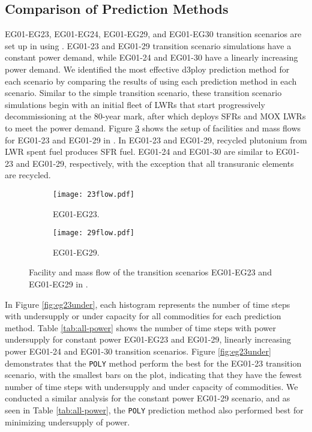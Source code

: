 \subsection{Comparison of Prediction Methods}

EG01-EG23, EG01-EG24, EG01-EG29, and EG01-EG30 transition scenarios
are set up in \Cyclus using \deploy. 
EG01-23 and EG01-29 transition scenario simulations have a constant 
power demand, while EG01-24 and EG01-30 have a linearly increasing
power demand. 
We identified the most effective d3ploy prediction method 
for each scenario by comparing the results of using each 
prediction method in each scenario. 
Similar to the simple transition scenario, these transition scenario 
simulations begin with an initial fleet of \glspl{LWR} 
that start progressively decommissioning at the 80-year mark, 
after which \deploy deploys \glspl{SFR} and \gls{MOX} \glspl{LWR} to meet 
the power demand. 
Figure \ref{fig:eg2329}
shows the setup of facilities and mass flows for 
EG01-23 and EG01-29 in \Cyclus. 
In EG01-23 and EG01-29, recycled plutonium from LWR spent fuel 
produces  \gls{SFR} fuel. 
EG01-24 and EG01-30 are similar to EG01-23 and EG01-29, respectively, 
with the exception that all transuranic elements are recycled.

\begin{figure}[]
	\centering
	\begin{subfigure}[t]{\textwidth}
		\centering
		\texttt{[image: 23flow.pdf]} 
		\caption{EG01-EG23.}
		\label{fig:23flow}
	\end{subfigure}
	\vspace{1cm}
	\begin{subfigure}[t]{\textwidth}
		\centering
		\texttt{[image: 29flow.pdf]} 
		\caption{EG01-EG29.}
		\label{fig:29flow}
	\end{subfigure}
	\hfill
	\caption{Facility and mass flow of the transition scenarios EG01-EG23 and EG01-EG29 in \Cyclus.}
	\label{fig:eg2329}
\end{figure}

In Figure \ref{fig:eg23under}, each histogram represents 
the number of time steps with undersupply or 
under capacity for all commodities for each prediction method.  
Table \ref{tab:all-power} shows the number of time steps with power 
undersupply for constant power EG01-EG23 and EG01-29, 
linearly increasing power EG01-24 and EG01-30 transition scenarios. 
Figure \ref{fig:eg23under} demonstrates that the \texttt{POLY} method
perform the best for the EG01-23 transition scenario,
with the smallest bars on the plot, indicating that they have the 
fewest number of time steps with undersupply and under capacity
of commodities. 
We conducted a similar analysis for the constant power EG01-29 scenario,
and as seen in Table \ref{tab:all-power}, the \texttt{POLY} prediction method 
also performed best for minimizing undersupply of power.  

